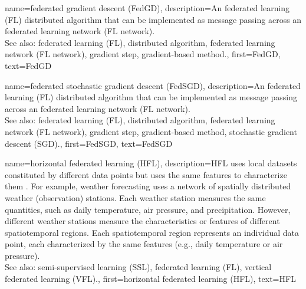 {
{name={federated gradient descent (FedGD)},
	description={An federated learning (FL) distributed algorithm that 
		can be implemented as message passing across an federated learning network (FL network). 
		\\ 
		See also: federated learning (FL), distributed algorithm, federated learning network (FL network), gradient step, gradient-based method.},
	first={FedGD},
	text={FedGD}
} 

{name={federated stochastic gradient descent (FedSGD)},
	description={An federated learning (FL) distributed algorithm that 
		can be implemented as message passing across an federated learning network (FL network). 
		\\ 
		See also: federated learning (FL), distributed algorithm, federated learning network (FL network), gradient step, gradient-based method, stochastic gradient descent (SGD).},
	first={FedSGD},
	text={FedSGD}
} 

{name={horizontal federated learning (HFL)},
	description={HFL uses local datasets constitut\-ed by different
	   	data points but uses the same features to characterize them \cite{HFLChapter2020}.
		For example, weather forecasting uses a network of spatially distributed
		weather (observation) stations. Each weather station measures the
		same quantities, such as daily temperature, air pressure, and precipitation.
		However, different weather stations measure the characteristics or
		features of different spatiotemporal regions. Each spatiotemporal region 
		represents an individual data point, each characterized by the same features 
		(e.g., daily temperature or air pressure).\\
		See also: semi-supervised learning (SSL), federated learning (FL), vertical federated learning (VFL).},
	first={horizontal federated learning (HFL)},
	text={HFL}
} 

}
